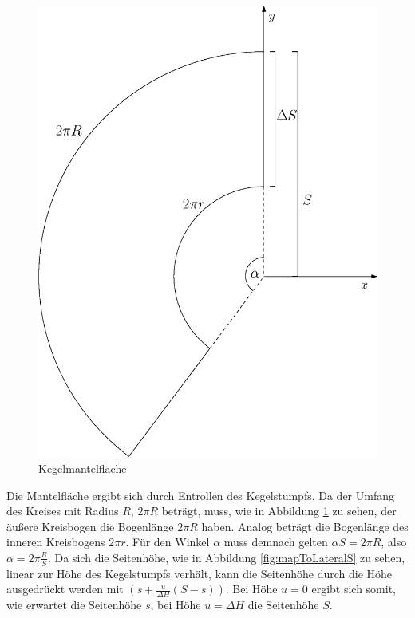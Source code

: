 \begin{figure}[!htb]
	\centering
	\includegraphics[scale=.4]{images/coneLateral.eps}
	\caption{Kegelmantelfläche}
	\label{fig:coneLateral}
\end{figure}

Die Mantelfläche ergibt sich durch Entrollen des Kegelstumpfs. Da der Umfang des Kreises mit Radius $R$, $2\pi R$ beträgt, muss, wie in Abbildung \ref{fig:coneLateral} zu sehen, der äußere Kreisbogen die Bogenlänge $2\pi R$ haben. Analog beträgt die Bogenlänge des inneren Kreisbogens $2\pi r$. Für den Winkel $\alpha$ muss demnach gelten $\alpha S = 2\pi R$, also  $\alpha = 2\pi\frac{R}{S}$. Da sich die Seitenhöhe, wie in Abbildung \ref{fig:mapToLateralS} zu sehen, linear zur Höhe des Kegelstumpfs verhält, kann die Seitenhöhe durch die Höhe ausgedrückt werden mit $(s + \frac{u}{\Delta H}(S-s))$. Bei Höhe $u = 0$ ergibt sich somit, wie erwartet die Seitenhöhe $s$, bei Höhe $u = \Delta H$ die Seitenhöhe $S$.


